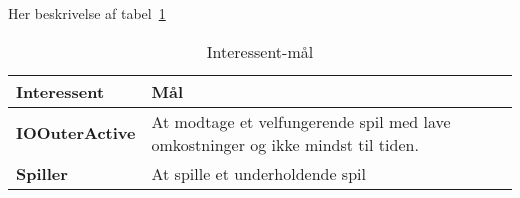 \documentclass[class=article, crop=false]{standalone}
\begin{document}
    Her beskrivelse af tabel~\ref{tab:interessent}

    \begin{table}[H]
        \caption{Interessent-mål\cite{del3}}\label{tab:interessent}
        \begin{tabularx}{\textwidth}{lX}

            \rowcolor[gray]{.8}
            \textbf{Interessent}& \textbf{Mål}   \\ \hline
            \textbf{IOOuterActive}       & At modtage et velfungerende spil med lave omkostninger og ikke mindst til tiden.\\
            \textbf{Spiller}      & At spille et underholdende spil\\ \hline


        \end{tabularx}


    \end{table}
\end{document}
